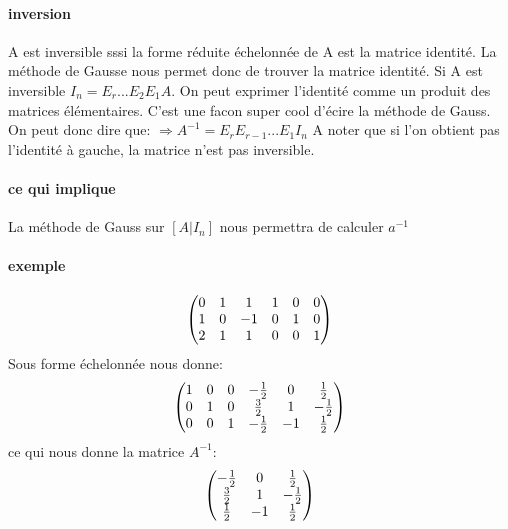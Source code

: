 \documentclass[a4paper,10pt]{article}
\begin{document}
\paragraph{inversion}
A est inversible sssi la forme réduite échelonnée de A est la matrice identité. La méthode de Gausse nous permet donc de trouver la matrice identité.
\newline
Si A est inversible $I_n=E_r...E_2E_1A$. On peut exprimer l'identité comme un produit des matrices élémentaires. C'est une facon super cool d'écire la méthode de Gauss.
\newline
On peut donc dire que:
\newline
$\Rightarrow A^{-1}=E_rE_{r-1}...E_1I_n$ A noter que si l'on obtient pas l'identité à gauche, la matrice n'est pas inversible.
\paragraph{ce qui implique}
La méthode de Gauss sur $[A|I_n]$ nous permettra de calculer $a^{-1}$
\paragraph{exemple}
\[
\begin{pmatrix}
0&1&1&1&0&0\cr
1&0&-1&0&1&0\cr
2&1&1&0&0&1\cr
\end{pmatrix}
\]
\newline
Sous forme échelonnée nous donne:
\newline
\[
\begin{pmatrix}
1&0&0&-\frac{1}{2}&0&\frac{1}{2}\cr
0&1&0&\frac{3}{2}&1&-\frac{1}{2}\cr
0&0&1&-\frac{1}{2}&-1&\frac{1}{2}\cr
\end{pmatrix}
\]
\newline
ce qui nous donne la matrice $A^{-1}$:
\newline
\[
\begin{pmatrix}
-\frac{1}{2}&0&\frac{1}{2}\cr
\frac{3}{2}&1&-\frac{1}{2}\cr
\frac{1}{2}&-1&\frac{1}{2}\cr
\end{pmatrix}
\]
\end{document}
